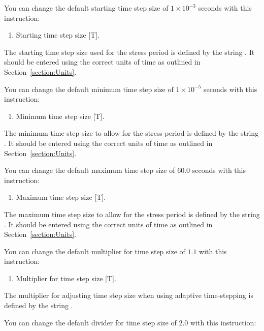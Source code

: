 You can change the default  starting time step size of  $1\times10^{-3}$ seconds with this instruction:

    {
        \squish
        \begin{enumerate}
        \item {}  Starting time step size [T].
        \end{enumerate}
        The  starting time step size used for the stress period  is defined by the string .  It should be entered using the correct units of time as outlined in Section~\ref{section:Units}.
    }

You can change the default  minimum time step size of  $1\times10^{-5}$ seconds with this instruction:

    {
        \squish
        \begin{enumerate}
        \item {}  Minimum time step size [T].
        \end{enumerate}
        The minimum time step size to allow for the stress period is defined by the string .  It should be entered using the correct units of time as outlined in Section~\ref{section:Units}.
    }

You can change the default  maximum time step size of  $60.0$ seconds with this instruction:

    {
        \squish
        \begin{enumerate}
        \item {}  Maximum time step size [T].
        \end{enumerate}
        The maximum time step size to allow for the stress period is defined by the string .  It should be entered using the correct units of time as outlined in Section~\ref{section:Units}.
    }


You can change the default multiplier for time step size of  $1.1$  with this instruction:

    {
        \squish
        \begin{enumerate}
        \item {}  Multiplier for time step size [T].
        \end{enumerate}
        The multiplier for adjusting time step size when using adaptive time-stepping is defined by the string .
    }

You can change the default divider for time step size of  $2.0$  with this instruction:

